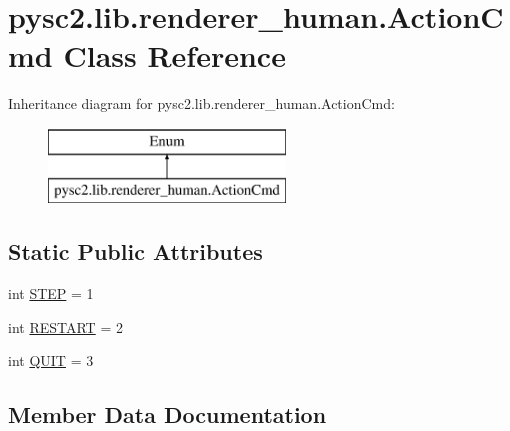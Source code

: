 \hypertarget{classpysc2_1_1lib_1_1renderer__human_1_1_action_cmd}{}\section{pysc2.\+lib.\+renderer\+\_\+human.\+Action\+Cmd Class Reference}
\label{classpysc2_1_1lib_1_1renderer__human_1_1_action_cmd}
Inheritance diagram for pysc2.\+lib.\+renderer\+\_\+human.\+Action\+Cmd\+:\begin{figure}[H]
\begin{center}
\leavevmode
\includegraphics[height=2.000000cm]{classpysc2_1_1lib_1_1renderer__human_1_1_action_cmd}
\end{center}
\end{figure}
\subsection*{Static Public Attributes}
\begin{DoxyCompactItemize}
\item 
int \mbox{\hyperlink{classpysc2_1_1lib_1_1renderer__human_1_1_action_cmd_a481c5c5b3a9a827342d2dfa3d9f051f8}{S\+T\+EP}} = 1
\item 
int \mbox{\hyperlink{classpysc2_1_1lib_1_1renderer__human_1_1_action_cmd_a41f806188a045304567cbe763e982904}{R\+E\+S\+T\+A\+RT}} = 2
\item 
int \mbox{\hyperlink{classpysc2_1_1lib_1_1renderer__human_1_1_action_cmd_ae18886cbd175c7d2627fc1963bcf3695}{Q\+U\+IT}} = 3
\end{DoxyCompactItemize}


\subsection{Member Data Documentation}
\mbox{\label{classpysc2_1_1lib_1_1renderer__human_1_1_action_cmd_ae18886cbd175c7d2627fc1963bcf3695}} 
